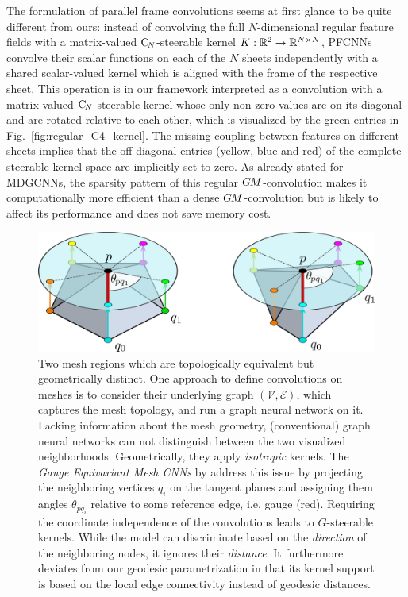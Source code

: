 The formulation of parallel frame convolutions seems at first glance to be quite different from ours:
instead of convolving the full $N$-dimensional regular feature fields with a matrix-valued $\operatorname{C}_{\!N}$-steerable kernel ${K: \mathbb{R}^2 \to \mathbb{R}^{N\times N}}$,
PFCNNs convolve their scalar functions on each of the $N$ sheets independently with a shared scalar-valued kernel which is aligned with the frame of the respective sheet.
This operation is in our framework interpreted as a convolution with a matrix-valued $\operatorname{C}_{\!N}$-steerable kernel whose only non-zero values are on its diagonal and are rotated relative to each other, which is visualized by the green entries in Fig.~\ref{fig:regular_C4_kernel}.
The missing coupling between features on different sheets implies that the off-diagonal entries (yellow, blue and red) of the complete steerable kernel space are implicitly set to zero.
As already stated for MDGCNNs, the sparsity pattern of this regular $G\mkern-1.4muM$-convolution makes it computationally more efficient than a dense $G\mkern-1.4muM$-convolution but is likely to affect its performance and does not save memory cost.






\begin{figure}
    \centering
    \includegraphics[width=.7\columnwidth]{figures/mesh_CNN_neighborhood_geometry.pdf}
    \vspace*{1ex}
    \caption{\small
        Two mesh regions which are topologically equivalent but geometrically distinct.
        One approach to define convolutions on meshes is to consider their underlying graph $(\mathcal{V},\mathcal{E})$, which captures the mesh topology, and run a graph neural network on it.
        Lacking information about the mesh geometry, (conventional) graph neural networks can not distinguish between the two visualized neighborhoods.
        Geometrically, they apply \emph{isotropic} kernels.
        The \emph{Gauge Equivariant Mesh CNNs} by \citet{deHaan2020meshCNNs} address this issue by projecting the neighboring vertices $q_i$ on the tangent planes and assigning them angles $\theta_{pq_i}$ relative to some reference edge, i.e. gauge (red).
        Requiring the coordinate independence of the convolutions leads to $G$-steerable kernels.
        While the model can discriminate based on the \emph{direction} of the neighboring nodes, it ignores their \emph{distance}.
        It furthermore deviates from our geodesic parametrization in that its kernel support is based on the local edge connectivity instead of geodesic distances.
        }
    \label{fig:mesh_CNNs_neighborhood}
\end{figure}


